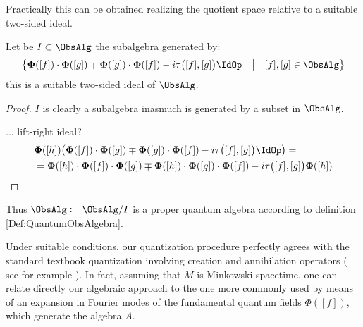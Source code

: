 \documentclass[Main]{subfiles}
\begin{document}
   		 		Practically this can be obtained realizing the quotient space relative to a suitable two-sided ideal.
   		 		\begin{proposition}
   		 			Let be $I \subset \ObsAlg$ the subalgebra generated by:
   		 				\begin{displaymath}
   		 					\big\{
   		 					 \mathbf{\Phi}([f]) \cdot \mathbf{\Phi}([g])  \mp \mathbf{\Phi}([g]) \cdot \mathbf{\Phi}([f]) - 
   		 				i \tau\big( [f], [g] \big)\IdOp \quad \big \vert \quad [f],[g]\in \ObsAlg
   		 					 \big\}
   		 				\end{displaymath}
   		 			this is a suitable two-sided ideal of $\ObsAlg$.
   		 		\end{proposition}
   		 		\begin{proof}
   		 			$I$ is clearly a subalgebra inasmuch is generated by a subset in $\ObsAlg$.
   		 			
   		 			... 	\danger lift-right ideal?
					\begin{align*}
						& \mathbf{\Phi}([h])\big(
   		 					 \mathbf{\Phi}([f]) \cdot \mathbf{\Phi}([g])  \mp \mathbf{\Phi}([g]) \cdot \mathbf{\Phi}([f]) - 
   		 				i \tau\big( [f], [g] \big)\IdOp
   		 					 \big)=\\
   		 				&= \mathbf{\Phi}([h]) \cdot \mathbf{\Phi}([f]) \cdot \mathbf{\Phi}([g]) \mp  \mathbf{\Phi}([h]) \cdot \mathbf{\Phi}([g]) \cdot \mathbf{\Phi}([f])
   		 					 - i \tau\big( [f], [g] \big) \mathbf{\Phi}([h])
   		 			\end{align*}					   		 			
   		 		\end{proof}
   		 		Thus $\mathbf{\ObsAlg} \coloneqq \ObsAlg / I$ is a proper quantum algebra according to definition \ref{Def:QuantumObsAlgebra}.   			
   			
			\begin{remark}
			Under suitable conditions, our quantization procedure perfectly agrees with the standard textbook quantization involving creation and annihilation operators ( see for example \cite{Mandl}). 
			In fact, assuming that $M$ is Minkowski spacetime, one can relate directly our algebraic approach to the one more commonly used by means of an expansion in Fourier modes of the fundamental quantum fields $\Phi([ f ])$, which generate the algebra $A$.
			\end{remark}   			
   			
\end{document}
